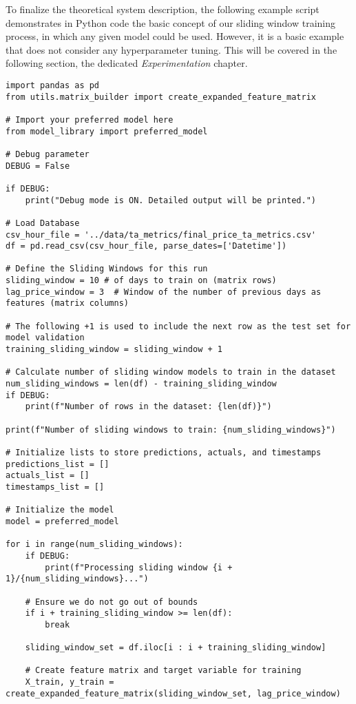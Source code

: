 \documentclass[12pt]{report} %
\begin{document}
To finalize the theoretical system description, the following example script demonstrates in Python code the basic concept of our sliding window training process, in which any given model could be used. However, it is a basic example that does not consider any hyperparameter tuning. This will be covered in the following section, the dedicated \textit{Experimentation} chapter.
\begin{lstlisting}
import pandas as pd
from utils.matrix_builder import create_expanded_feature_matrix

# Import your preferred model here
from model_library import preferred_model

# Debug parameter
DEBUG = False

if DEBUG:
    print("Debug mode is ON. Detailed output will be printed.")

# Load Database
csv_hour_file = '../data/ta_metrics/final_price_ta_metrics.csv'
df = pd.read_csv(csv_hour_file, parse_dates=['Datetime'])

# Define the Sliding Windows for this run
sliding_window = 10 # of days to train on (matrix rows)
lag_price_window = 3  # Window of the number of previous days as features (matrix columns)

# The following +1 is used to include the next row as the test set for model validation
training_sliding_window = sliding_window + 1

# Calculate number of sliding window models to train in the dataset
num_sliding_windows = len(df) - training_sliding_window
if DEBUG:
    print(f"Number of rows in the dataset: {len(df)}")

print(f"Number of sliding windows to train: {num_sliding_windows}")

# Initialize lists to store predictions, actuals, and timestamps
predictions_list = []
actuals_list = []
timestamps_list = []

# Initialize the model
model = preferred_model

for i in range(num_sliding_windows):
    if DEBUG:
        print(f"Processing sliding window {i + 1}/{num_sliding_windows}...")

    # Ensure we do not go out of bounds
    if i + training_sliding_window >= len(df):
        break
    
    sliding_window_set = df.iloc[i : i + training_sliding_window]
    
    # Create feature matrix and target variable for training
    X_train, y_train = create_expanded_feature_matrix(sliding_window_set, lag_price_window)
    

\end{lstlisting}
\end{document}
